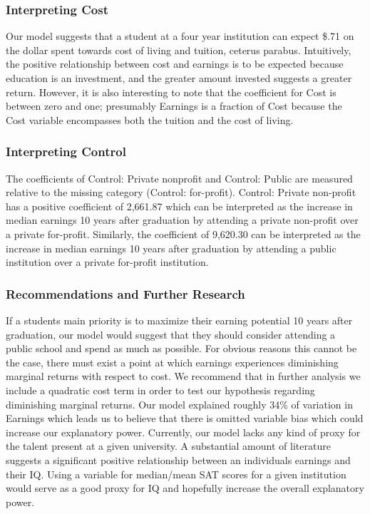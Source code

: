 \documentclass[%
 reprint,
 amsmath,amssymb,
 aps,
]{revtex4-1}
\begin{document}
\subsubsection{Interpreting Cost}
Our model suggests that a student at a four year institution can expect \$.71 on the dollar spent towards cost of living and tuition, ceterus parabus. Intuitively, the positive relationship between cost and earnings is to be expected because education is an investment, and the greater amount invested suggests a greater return. However, it is also interesting to note that the coefficient for Cost is between zero and one; presumably Earnings is a fraction of Cost because the Cost variable encompasses both the tuition and the cost of living. 

\subsubsection{Interpreting Control}
The coefficients of Control: Private nonprofit and Control: Public are measured relative to the missing category (Control: for-profit).  Control: Private non-profit has a positive coefficient of 2,661.87 which can be interpreted as the increase in median earnings 10 years after graduation by attending a private non-profit over a private for-profit.  Similarly, the coefficient of 9,620.30 can be interpreted as the increase in median earnings 10 years after graduation by attending a public institution over a private for-profit institution.


\subsubsection{Recommendations and Further Research}
If a students main priority is to maximize their earning potential 10 years after graduation, our model would suggest that they should consider attending a public school and spend as much as possible. For obvious reasons this cannot be the case, there must exist a point at which earnings experiences diminishing marginal returns with respect to cost. We recommend that in further analysis we include a quadratic cost term in order to test our hypothesis regarding diminishing marginal returns. Our model explained roughly 34\% of variation in Earnings which leads us to believe that there is omitted variable bias which could increase our explanatory power.  Currently, our model lacks any kind of proxy for the talent present at a given university.  A substantial amount of literature suggests a significant positive relationship between an individuals earnings and their IQ. Using a variable for median/mean SAT scores for a given institution would serve as a good proxy for IQ and hopefully increase the overall explanatory power.  
\end{document}
